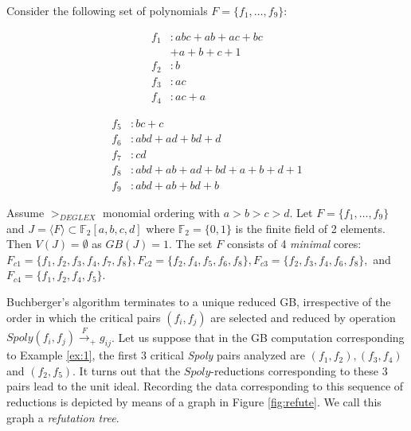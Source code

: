 \begin{Example}
\label{ex:1}
Consider the following set of polynomials $F = \{f_1,\dots, f_9\}$:

\begin{minipage}{2in}
\begin{align*}
f_1&: abc + ab + ac + bc \\
   & + a + b + c + 1\\
f_2&: b\\
f_3&: ac\\
f_4&: ac + a
\end{align*}
\end{minipage}
\begin{minipage}{3in}
\begin{align*}
f_5&: bc + c\\
f_6&: abd + ad + bd + d\\
f_7&: cd\\
f_8&: abd + ab + ad + bd + a + b + d + 1\\
f_9&: abd + ab +bd + b
\end{align*}
\end{minipage}



Assume $>_{DEGLEX}$ monomial ordering with $a>b>c>d$. 
Let $F = \{f_1,\dots,f_9\}$ and 
$J = \langle F \rangle \subset \mathbb{F}_2[a,b,c,d]$ where
$\mathbb{F}_2 = \{0, 1\}$ is the finite field of 2 elements. Then 
$V(J) = \emptyset$ as $GB(J) = 1$.  The set $F$ consists of 4 {\it minimal}
cores: $F_{c1} = \{ f_1,f_2,f_3,f_4,f_7,f_8\}, F_{c2} = \{
f_2,f_4,f_5,f_6,f_8\}, F_{c3} = \{ f_2,f_3,f_4,f_6,f_8\},$ and $F_{c4}
= \{ f_1,f_2,f_4,f_5\}$. 
\end{Example}

Buchberger's algorithm terminates to a unique reduced GB, irrespective
of the order in which the critical pairs $(f_i,f_j)$ are selected and reduced by operation
$Spoly(f_i,f_j)\xrightarrow{F}_+g_{ij}$. Let us suppose that in the GB
computation corresponding to Example \ref{ex:1}, the first 3 critical
{\it Spoly} pairs analyzed are $(f_1, f_2), (f_3, f_4)$ and
$(f_2,f_5)$. It turns out that the $Spoly$-reductions corresponding to
these 3 pairs lead to the unit ideal. Recording the data
corresponding to this sequence of reductions is depicted by means of a
graph in Figure \ref{fig:refute}. We call this graph a {\it refutation tree}. 


